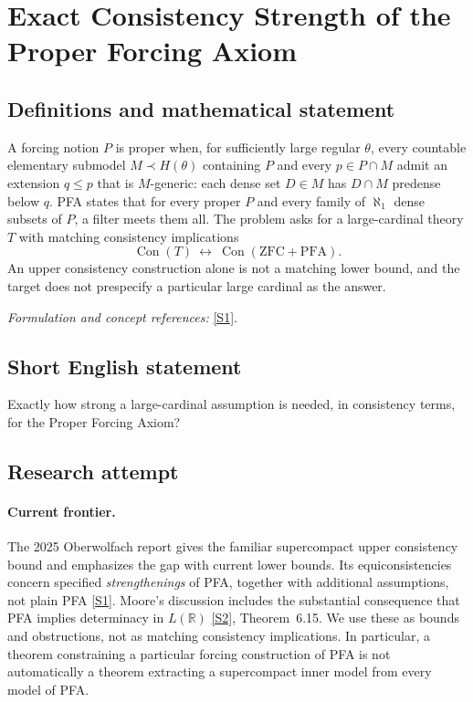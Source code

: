 \documentclass[11pt,a4paper]{article}
\newcommand{\R}{\mathbb{R}}
\newcommand{\sref}[2]{\hyperlink{source:#1:#2}{[S#2]}}
\newif\ifshowcatalogue
\newcommand{\cataloguescope}[1]{\ifshowcatalogue
 \paragraph{Exact scope in the supplied catalogue.}
 \begin{quote}\small #1\end{quote}\fi}
\numberwithin{equation}{section}
\begin{document}
\setcounter{section}{0}
\clearpage
\section*{\texorpdfstring{Exact Consistency Strength of the Proper Forcing Axiom}{Exact Consistency Strength of the Proper Forcing Axiom}}\label{30006783}
\subsection{Definitions and mathematical statement}
A forcing notion $P$ is proper when, for sufficiently large regular $\theta$, every countable elementary submodel $M\prec H(\theta)$ containing $P$ and every $p\in P\cap M$ admit an extension $q\le p$ that is $M$-generic: each dense set $D\in M$ has $D\cap M$ predense below $q$. PFA states that for every proper $P$ and every family of $\aleph_1$ dense subsets of $P$, a filter meets them all. The problem asks for a large-cardinal theory $T$ with matching consistency implications
\[
 \operatorname{Con}(T)\ \longleftrightarrow\ \operatorname{Con}(\mathrm{ZFC}+\mathrm{PFA}).
\]
An upper consistency construction alone is not a matching lower bound, and the target does not prespecify a particular large cardinal as the answer.
\par\smallskip\textit{Formulation and concept references:} \sref{30006783}{1}.
\cataloguescope{Determine the exact large-cardinal consistency strength of ZFC plus the Proper Forcing Axiom (PFA): identify its equiconsistency level by matching upper and lower consistency bounds.}
\subsection{Short English statement}
Exactly how strong a large-cardinal assumption is needed, in consistency terms, for the Proper Forcing Axiom?
\subsection{Research attempt}

\paragraph{Current frontier.}
The 2025 Oberwolfach report gives the familiar supercompact upper consistency bound and emphasizes the gap with current lower bounds. Its equiconsistencies concern specified \emph{strengthenings} of PFA, together with additional assumptions, not plain PFA \sref{30006783}{1}. Moore's discussion includes the substantial consequence that PFA implies determinacy in $L(\R)$ \sref{30006783}{2}, Theorem~6.15. We use these as bounds and obstructions, not as matching consistency implications. In particular, a theorem constraining a particular forcing construction of PFA is not automatically a theorem extracting a supercompact inner model from every model of PFA.
\end{document}
